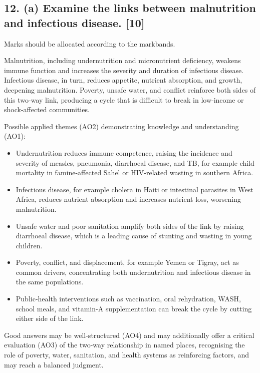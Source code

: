 \documentclass[11pt,a4paper]{article}
\begin{document}
\newpage

\subsection*{12. (a) Examine the links between malnutrition and infectious disease. \hfill[10]}

Marks should be allocated according to the markbands.

Malnutrition, including undernutrition and micronutrient deficiency, weakens
immune function and increases the severity and duration of infectious disease.
Infectious disease, in turn, reduces appetite, nutrient absorption, and growth,
deepening malnutrition. Poverty, unsafe water, and conflict reinforce both
sides of this two-way link, producing a cycle that is difficult to break in
low-income or shock-affected communities.

Possible applied themes (AO2) demonstrating knowledge and understanding (AO1):
\begin{itemize}
  \item Undernutrition reduces immune competence, raising the incidence and
  severity of measles, pneumonia, diarrhoeal disease, and TB, for example
  child mortality in famine-affected Sahel or HIV-related wasting in southern
  Africa.
  \item Infectious disease, for example cholera in Haiti or intestinal
  parasites in West Africa, reduces nutrient absorption and increases nutrient
  loss, worsening malnutrition.
  \item Unsafe water and poor sanitation amplify both sides of the link by
  raising diarrhoeal disease, which is a leading cause of stunting and wasting
  in young children.
  \item Poverty, conflict, and displacement, for example Yemen or Tigray, act
  as common drivers, concentrating both undernutrition and infectious disease
  in the same populations.
  \item Public-health interventions such as vaccination, oral rehydration,
  WASH, school meals, and vitamin-A supplementation can break the cycle by
  cutting either side of the link.
\end{itemize}

Good answers may be well-structured (AO4) and may additionally offer a
critical evaluation (AO3) of the two-way relationship in named places,
recognising the role of poverty, water, sanitation, and health systems as
reinforcing factors, and may reach a balanced judgment.
\end{document}
